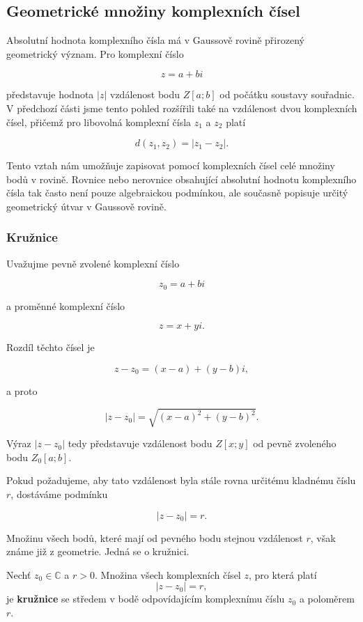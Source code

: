 \documentclass[12pt,a4paper]{article}
\begin{document}

\subsection{Geometrické množiny komplexních čísel}

Absolutní hodnota komplexního čísla má v Gaussově rovině přirozený geometrický
význam. Pro komplexní číslo

\[
    z=a+bi
\]

představuje hodnota $|z|$ vzdálenost bodu $Z[a;b]$ od počátku soustavy souřadnic.
V předchozí části jsme tento pohled rozšířili také na vzdálenost dvou komplexních
čísel, přičemž pro libovolná komplexní čísla $z_1$ a $z_2$ platí

\[
    d(z_1,z_2)=|z_1-z_2|.
\]

Tento vztah nám umožňuje zapisovat pomocí komplexních čísel celé množiny bodů
v rovině. Rovnice nebo nerovnice obsahující absolutní hodnotu komplexního čísla
tak často není pouze algebraickou podmínkou, ale současně popisuje určitý
geometrický útvar v Gaussově rovině.


\subsubsection*{Kružnice}

Uvažujme pevně zvolené komplexní číslo

\[
    z_0=a+bi
\]

a proměnné komplexní číslo

\[
    z=x+yi.
\]

Rozdíl těchto čísel je

\[
    z-z_0=(x-a)+(y-b)i,
\]

a proto

\[
    |z-z_0|
    =
    \sqrt{(x-a)^2+(y-b)^2}.
\]

Výraz $|z-z_0|$ tedy představuje vzdálenost bodu $Z[x;y]$ od pevně zvoleného
bodu $Z_0[a;b]$.

Pokud požadujeme, aby tato vzdálenost byla stále rovna určitému kladnému číslu
$r$, dostáváme podmínku

\[
    |z-z_0|=r.
\]

Množinu všech bodů, které mají od pevného bodu stejnou vzdálenost $r$, však
známe již z geometrie. Jedná se o kružnici.

\begin{definitionbox}
    Nechť $z_0\in\mathbb{C}$ a $r>0$. Množina všech komplexních čísel $z$, pro která platí
    \[
        |z-z_0|=r,
    \]
    je \textbf{kružnice} se středem v bodě odpovídajícím komplexnímu číslu $z_0$ a poloměrem $r$.
\end{definitionbox}
\end{document}
